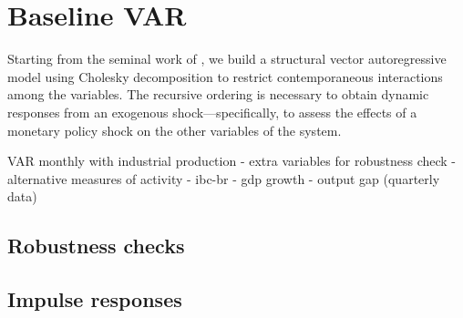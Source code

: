 \section{Baseline VAR}
    Starting from the seminal work of \citet{Sims1992}, we build a structural vector autoregressive model using Cholesky decomposition to restrict contemporaneous interactions among the variables. The recursive ordering is necessary to obtain dynamic responses from an exogenous shock---specifically, to assess the effects of a monetary policy shock on the other variables of the system.

VAR monthly with industrial production
    - extra variables for robustness check
    - alternative measures of activity
        - ibc-br
        - gdp growth
        - output gap (quarterly data)

    
    
    
    \subsection{Robustness checks}
    \subsection{Impulse responses}
        \lipsum[1]